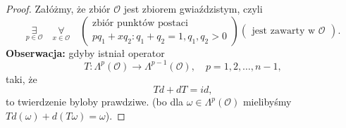 \documentclass[../main.tex]{subfiles}
\begin{document}
\begin{proof}
    Załóżmy, że zbiór $\mathcal{O}$ jest zbiorem gwiaździstym, czyli
    \[
        \underset{p\in\mathcal{O}}{\exists}\quad \underset{x\in \mathcal{O}}{\forall}\quad \begin{pmatrix}\text{zbiór punktów postaci}\\ pq_1 + xq_2: q_1+q_2 = 1, q_1,q_2 > 0\end{pmatrix}\begin{pmatrix} \text{jest zawarty w }\mathcal{O} \end{pmatrix}
    .\]
\textbf{Obserwacja:} gdyby istniał operator
    \[
        T: \Lambda^p(\mathcal{O}) \to \Lambda^{p-1}(\mathcal{O}),\quad p = 1,2,\ldots,n-1,
    \]
    taki, że
\[
Td + dT = id
,\]
to twierdzenie byloby prawdziwe. (bo dla $\omega\in \Lambda^p(\mathcal{O})$ mielibyśmy $Td(\omega) + d(T\omega) = \omega$).


\end{proof}
\end{document}

